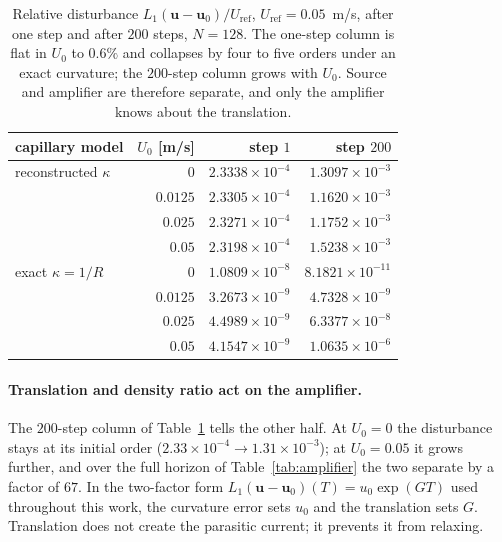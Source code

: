 \documentclass[preprint,3p,11pt]{elsarticle}
\newcommand{\uvec}{\mathbf{u}}
\begin{document}
\begin{table}[t]
  \centering
  \caption{Relative disturbance $L_1(\uvec-\uvec_0)/U_{\mathrm{ref}}$,
  $U_{\mathrm{ref}}=0.05$~m/s, after one step and after $200$ steps, $N=128$. The one-step
  column is flat in $U_0$ to $0.6\%$ and collapses by four to five orders under an exact
  curvature; the $200$-step column grows with $U_0$. Source and amplifier are therefore
  separate, and only the amplifier knows about the translation.}
  \label{tab:kickorigin}
  \begin{tabular}{l r r r}
    \hline
    capillary model & $U_0$ [m/s] & step $1$ & step $200$ \\
    \hline
    reconstructed $\kappa$ & $0$      & $2.3338\times10^{-4}$ & $1.3097\times10^{-3}$ \\
                           & $0.0125$ & $2.3305\times10^{-4}$ & $1.1620\times10^{-3}$ \\
                           & $0.025$  & $2.3271\times10^{-4}$ & $1.1752\times10^{-3}$ \\
                           & $0.05$   & $2.3198\times10^{-4}$ & $1.5238\times10^{-3}$ \\
    \hline
    exact $\kappa=1/R$     & $0$      & $1.0809\times10^{-8}$ & $8.1821\times10^{-11}$ \\
                           & $0.0125$ & $3.2673\times10^{-9}$ & $4.7328\times10^{-9}$ \\
                           & $0.025$  & $4.4989\times10^{-9}$ & $6.3377\times10^{-8}$ \\
                           & $0.05$   & $4.1547\times10^{-9}$ & $1.0635\times10^{-6}$ \\
    \hline
  \end{tabular}
\end{table}

\paragraph{Translation and density ratio act on the amplifier.} The $200$-step column of
Table~\ref{tab:kickorigin} tells the other half. At $U_0=0$ the disturbance stays at its initial order
($2.33\times10^{-4}\to1.31\times10^{-3}$); at $U_0=0.05$ it grows further, and over the full
horizon of Table~\ref{tab:amplifier} the two separate by a factor of $67$.
In the two-factor form $L_1(\uvec-\uvec_0)(T)=u_0\exp(G T)$ used throughout this
work, the curvature error sets $u_0$ and the translation sets $G$. Translation does not
create the parasitic current; it prevents it from relaxing.
\end{document}
